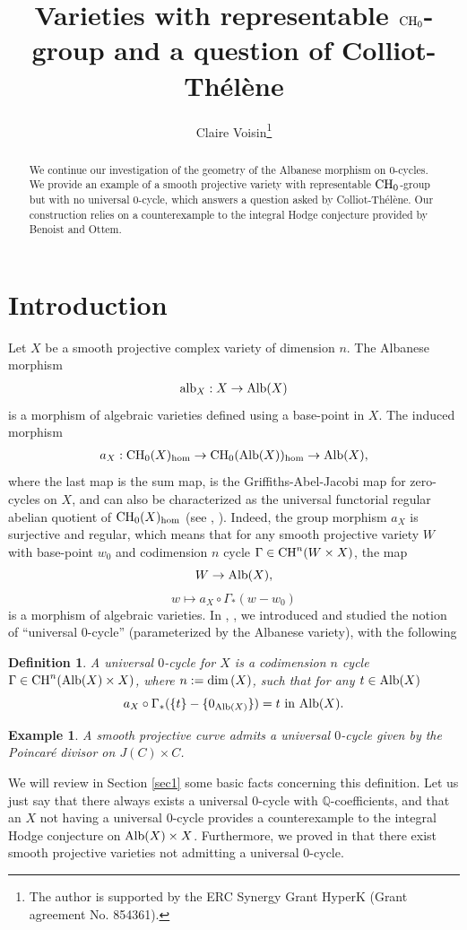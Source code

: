 \documentclass[10pt]{article}
\title{Varieties with representable ${\rm CH}_0$-group and a question of Colliot-Th\'{e}l\`{e}ne}
\author{Claire Voisin\footnote{The author is supported by the ERC Synergy Grant HyperK (Grant agreement No. 854361).}}
\date{}
\newtheorem{Defi}[theo]{Definition}
\newtheorem{example}[theo]{Example}
\begin{document}
\maketitle
\begin{abstract}  We continue our investigation of the geometry of the Albanese  morphism on  0-cycles. We provide an example of a smooth projective variety with representable ${\rm CH}_0$-group  but with no universal $0$-cycle, which answers a question asked by Colliot-Thélène. Our construction relies on a counterexample to the integral Hodge conjecture provided by Benoist and Ottem.
 \end{abstract}
\section{Introduction}
Let $X$ be  a smooth projective complex variety of dimension $n$. The Albanese morphism
\begin{eqnarray}\label{eqalbmoroh} {\rm alb}_X: X\rightarrow {\rm Alb}(X)\end{eqnarray} is a morphism of algebraic varieties defined using a base-point in $X$. The induced morphism
\begin{eqnarray}\label{eqaX} a_X: {\rm CH}_0(X)_{\rm hom}\rightarrow  {\rm CH}_0({\rm Alb}(X))_{\rm hom}\rightarrow {\rm Alb}(X), \end{eqnarray}
where the last map is the sum map, is  the Griffiths-Abel-Jacobi map for zero-cycles on $X$, and can also be characterized as the universal functorial regular abelian quotient of ${\rm CH}_0(X)_{\rm hom}$ (see \cite{murre}, \cite{serre}). Indeed, the group morphism $a_X$ is surjective and regular, which means that for any smooth projective variety $W$ with base-point $w_0$ and codimension $n$ cycle $\Gamma\in{\rm CH}^n(W\times X)$, the map
$$W\rightarrow {\rm Alb}(X),$$
$$w\mapsto a_X\circ\Gamma_*(w-w_0)$$
is a morphism of algebraic varieties. In \cite{voisinArbarello}, \cite{voisincollino}, we introduced and studied the notion of ``universal $0$-cycle'' (parameterized by the Albanese variety), with the following
\begin{Defi} A universal $0$-cycle for $X$ is a codimension $n$ cycle $\Gamma\in{\rm CH}^n({\rm Alb}(X)\times X)$, where $n:={\rm dim}\,(X)$, such that for any $t\in {\rm Alb}(X)$
$$a_X\circ \Gamma_*(\{t\}-\{0_{{\rm Alb}(X)}\})=t\,\, {\rm in}\,\,{\rm Alb}(X).$$
\end{Defi}
\begin{example}\label{example}{\rm A smooth projective curve admits a universal $0$-cycle given by the Poincar\'{e} divisor on $J(C)\times C $.}
\end{example}
We will review in Section \ref{sec1} some basic facts concerning this definition. Let us just say that there always exists a universal $0$-cycle with $\mathbb{Q}$-coefficients, and that an $X$ not having a universal $0$-cycle provides a counterexample to the integral Hodge conjecture  on ${\rm Alb}(X)\times X$.
Furthermore, we proved in \cite{voisincollino} that  there exist smooth projective varieties not admitting a universal $0$-cycle.
\end{document}
